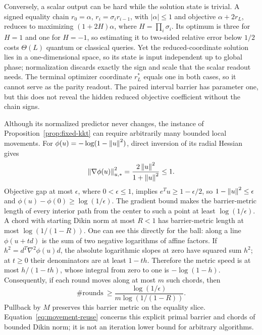 Conversely, a scalar output can be hard while the solution state is
trivial.  A signed equality
chain $r_0=\alpha$, $r_i=\sigma_i r_{i-1}$, with $|\alpha|\leq1$
and objective $\alpha+2r_L$, reduces to maximizing
$(1+2H)\alpha$, where $H=\prod_i\sigma_i$.
Its optimum is three for $H=1$ and one for $H=-1$, so estimating it to
two-sided relative error below $1/2$ costs $\Theta(L)$ quantum or
classical queries.  Yet the reduced-coordinate solution lies in a one-dimensional space, so
its state is input independent up to global phase; normalization discards
exactly the sign and scale that the scalar readout needs.  The terminal
optimizer coordinate $r_L^*$ equals one in both cases, so it cannot serve
as the parity readout.  The paired interval barrier has parameter one, but
this does not reveal the hidden reduced objective coefficient without the
chain signs.

Although its normalized predictor never changes, the instance of
Proposition~\ref{prop:fixed-kkt} can require arbitrarily many bounded
local movements.  For $\phi(u)=-\log(1-\left\lVert u\right\rVert^2)$, direct inversion of its
radial Hessian gives
\[
 \left\lVert\nabla\phi(u)\right\rVert_{u,*}^2
   =\frac{2\left\lVert u\right\rVert^2}{1+\left\lVert u\right\rVert^2}\leq1.
\]
Objective gap at most $\epsilon$, where $0<\epsilon\leq1$, implies
$e^Tu\geq1-\epsilon/2$, so $1-\left\lVert u\right\rVert^2\leq\epsilon$ and
$\phi(u)-\phi(0)\geq\log(1/\epsilon)$.
The gradient bound makes the barrier-metric length of every interior path
from the center to such a point at least $\log(1/\epsilon)$.
A chord with starting Dikin norm at most $R<1$ has barrier-metric
length at most $\log(1/(1-R))$.  One can see this directly for the ball: along a line
$\phi(u+td)$ is the sum of two negative logarithms of affine factors.
If $h^2=d^T\nabla^2\phi(u)d$, the absolute logarithmic slopes at zero
have squared sum $h^2$; at $t\geq0$ their denominators are at least
$1-th$.  Therefore the metric speed is at most $h/(1-th)$, whose
integral from zero to one is $-\log(1-h)$.
Consequently, if each round moves along at most $m$ such chords, then
\begin{equation}\label{eq:movement-reuse}
 \#\text{rounds}\ \geq
 \frac{\log(1/\epsilon)}{m\log(1/(1-R))}.
\end{equation}
Pullback by $M$ preserves this barrier metric on the equality slice.
Equation~\eqref{eq:movement-reuse} concerns this explicit primal barrier
and chords of bounded Dikin norm; it is not an iteration lower bound for
arbitrary algorithms.

